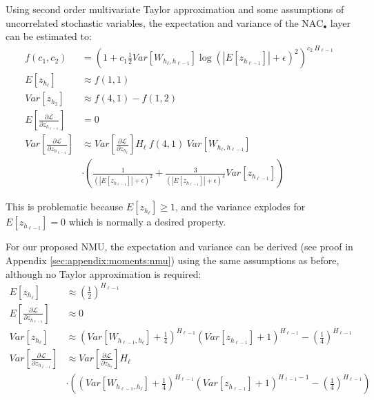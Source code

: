 Using second order multivariate Taylor approximation and some assumptions of uncorrelated stochastic variables, the expectation and variance of the $\mathrm{NAC}_{\bullet}$ layer can be estimated to:
\begin{equation}
\begin{aligned}
f(c_1, c_2) &= \left(1 + c_1 \frac{1}{2} Var[W_{h_\ell, h_{\ell-1}}] \log(|E[z_{h_{\ell-1}}]| + \epsilon)^2\right)^{c_2\ H_{\ell-1}} \\
E[z_{h_\ell}] &\approx f\left(1, 1\right) \\
Var[z_{h_2}] &\approx f\left(4, 1\right) - f\left(1, 2\right) \\
E\left[\frac{\partial \mathcal{L}}{\partial z_{h_{\ell-1}}}\right] &= 0 \\
Var\left[\frac{\partial \mathcal{L}}{\partial z_{h_{\ell-1}}}\right] &\approx Var\left[\frac{\partial \mathcal{L}}{\partial z_{h_{\ell}}}\right] H_{\ell}\ f\left(4, 1\right)\ Var[W_{h_{\ell}, h_{\ell-1}}] \\
&\cdot \left(\frac{1}{\left(|E[z_{h_{\ell-1}}]| + \epsilon\right)^2} + \frac{3}{\left(|E[z_{h_{\ell-1}}]| + \epsilon\right)^4} Var[z_{h_{\ell-1}}]\right)
\end{aligned}
\end{equation}

This is problematic because $E[z_{h_\ell}] \ge 1$, and the variance explodes for $E[z_{h_{\ell-1}}] = 0$ which is normally a desired property.

For our proposed NMU, the expectation and variance can be derived (see proof in Appendix \ref{sec:appendix:moments:nmu}) using the same assumptions as before, although no Taylor approximation is required:
\begin{equation}
\begin{aligned}
E[z_{h_\ell}] &\approx \left(\frac{1}{2}\right)^{H_{\ell-1}} \\
E\left[\frac{\partial \mathcal{L}}{\partial z_{h_{\ell-1}}}\right] &\approx 0 \\
Var[z_{h_\ell}] &\approx \left(Var[W_{h_{\ell-1},h_\ell}] + \frac{1}{4}\right)^{H_{\ell-1}} \left(Var[z_{h_{\ell-1}}] + 1\right)^{H_{\ell-1}} - \left(\frac{1}{4}\right)^{H_{\ell-1}} \\
Var\left[\frac{\partial \mathcal{L}}{\partial z_{h_{\ell-1}}}\right] &\approx Var\left[\frac{\partial \mathcal{L}}{\partial z_{h_\ell}}\right] H_\ell \\
& \cdot \left( \left(Var[W_{h_{\ell-1},h_\ell}] + \frac{1}{4}\right)^{H_{\ell-1}} \left(Var[z_{h_{\ell-1}}] + 1\right)^{H_{\ell-1}-1} - \left(\frac{1}{4}\right)^{H_{\ell-1}}\right)
\end{aligned}
\end{equation}

